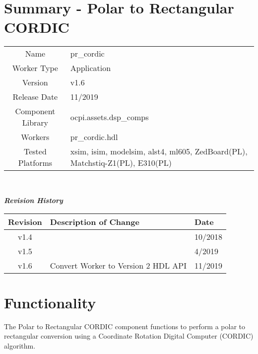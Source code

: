 \documentclass{article}
\author{} %
\date{Version \docVersion} %
\title{\docTitle}
\def\docVersion{1.6}
\def\comp{pr\_cordic}
\def\Comp{Polar to Rectangular CORDIC}
\begin{document}
\section*{Summary - \Comp}
\begin{tabular}{|c|M{13.5cm}|}
	\hline
	                  &                                                              \\
	\hline
	Name              & \comp                                                        \\
	\hline
	Worker Type       & Application                                                  \\
	\hline
	Version           & v\docVersion \\
	\hline
	Release Date      & 11/2019 \\
	\hline
	Component Library & ocpi.assets.dsp\_comps                                        \\
	\hline
	Workers           & \comp.hdl                                                    \\
	\hline
	Tested Platforms  & xsim, isim, modelsim, alst4, ml605, ZedBoard(PL), Matchstiq-Z1(PL), E310(PL)\\
	\hline
\end{tabular}\\ \bigskip

\begin{center}
	\textit{\textbf{Revision History}}
	\begin{table}[H]
	\label{table:revisions} %
		\begin{tabularx}{\textwidth}{|c|X|l|}
		\hline
		\rowcolor{blue}
		\textbf{Revision} & \textbf{Description of Change} & \textbf{Date} \\
		\hline
		v1.4 & & 10/2018 \\
		\hline
		v1.5 & & 4/2019 \\
		\hline
		v1.6 & Convert Worker to Version 2 HDL API & 11/2019 \\
		\hline
		\end{tabularx}
	\end{table}
\end{center}

\section*{Functionality}
\begin{flushleft}
	The {\Comp} component functions to perform a polar to rectangular conversion using a Coordinate Rotation Digital Computer (CORDIC) algorithm.
\end{flushleft}
\end{document}
